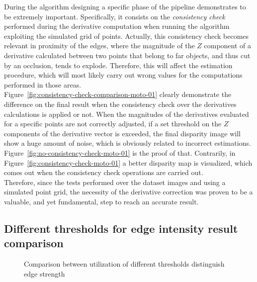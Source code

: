 During the algorithm designing a specific phase of the pipeline demonstrates to be extremely important. 
Specifically, it consists on the \textit{consistency check} performed during the derivative computation when running the algorithm exploiting the simulated grid of points.
Actually, this consistency check becomes relevant in proximity of the edges, where the magnitude of the $Z$ component of a derivative calculated between two points that belong to far objects, and thus cut by an occlusion, tends to explode.
Therefore, this will affect the estimation procedure, which will most likely carry out wrong values for the computations performed in those areas. \\
Figure~\ref{fig:consistency-check-comparison-moto-01} clearly demonstrate the difference on the final result when the consistency check over the derivatives calculations is applied or not.
When the magnitudes of the derivatives evaluated for a specific points are not correctly adjusted, if a set threshold on the $Z$ components of the derivative vector is exceeded, the final disparity image will show a huge amount of noise, which is obviously related to incorrect estimations.
Figure~\ref{fig:no-consistency-check-moto-01} is the proof of that.
Contrarily, in Figure~\ref{fig:consistency-check-moto-01} a better disparity map is visualized, which comes out when the consistency check operations are carried out.\\
Therefore, since the tests performed over the dataset images and using a simulated point grid, the necessity of the derivative correction was proven to be a valuable, and yet fundamental, step to reach an accurate result.

\subsection{Different thresholds for edge intensity result comparison}
\label{subsection:soft-strong-edge-threshold}

\begin{figure}[t]
	\centering
\caption{Comparison between utilization of different thresholds distinguish edge strength}
\label{fig:threshold-soft-strong-edges-micro-01}
\end{figure}

